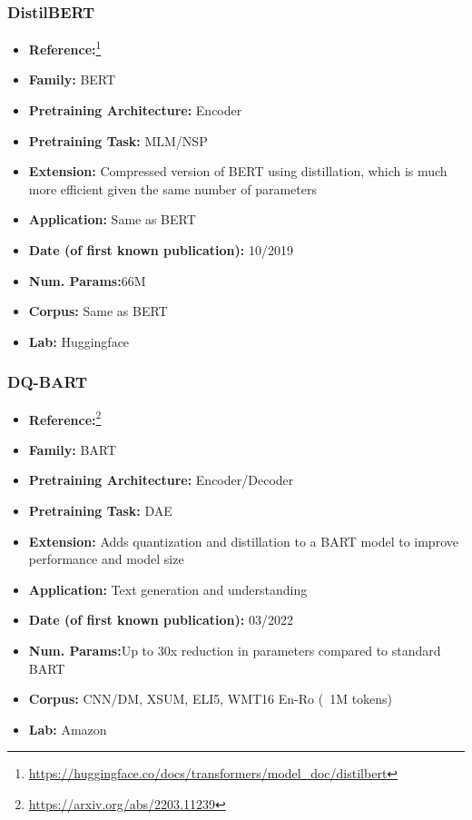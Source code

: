 \documentclass{article}
\begin{document}
\subsubsection{DistilBERT}
            \begin{itemize}
                \item \textbf{Reference:}\footnote{\url{https://huggingface.co/docs/transformers/model_doc/distilbert}}\cite{sanh2019distilbert}
                \item \textbf{Family:} BERT 
                \item \textbf{Pretraining Architecture:} Encoder
                \item \textbf{Pretraining Task:} MLM/NSP
                \item \textbf{Extension:} Compressed version of BERT using distillation, which is much more efficient given the same number of parameters  
                \item \textbf{Application:} Same as BERT
                \item \textbf{Date (of first known publication):} 10/2019
                \item \textbf{Num. Params:}66M
                \item \textbf{Corpus:} Same as BERT
                \item \textbf{Lab:} Huggingface
            \end{itemize}
            
\subsubsection{DQ-BART}

            \begin{itemize}
                \item \textbf{Reference:}\footnote{\url{https://arxiv.org/abs/2203.11239}}\cite{li2022dq}
                \item \textbf{Family:} BART 
                \item \textbf{Pretraining Architecture:} Encoder/Decoder
                \item \textbf{Pretraining Task:} DAE
                \item \textbf{Extension:} Adds quantization and distillation to a BART model to improve performance and model size  
                \item \textbf{Application:} Text generation and understanding
                \item \textbf{Date (of first known publication):} 03/2022
                \item \textbf{Num. Params:}Up to 30x reduction in parameters compared to standard BART
                \item \textbf{Corpus:} CNN/DM, XSUM, ELI5, WMT16 En-Ro (~1M tokens)
                \item \textbf{Lab:} Amazon
            \end{itemize}
\end{document}
